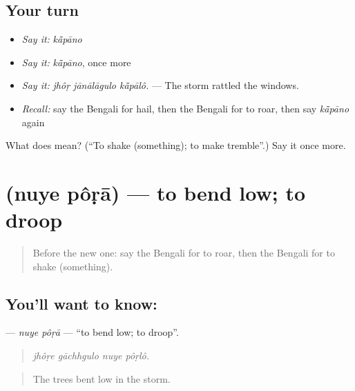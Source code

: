 \subsection*{Your turn}
\begin{itemize}
\raggedright
  \item \emph{Say it:} \emph{kā̃pāno}
  \item \emph{Say it:} \emph{kā̃pāno}, once more
  \item \emph{Say it:} \emph{jhôṛ jānālāgulo kā̃pālô.} — The storm rattled the windows.
  \item \emph{Recall:} say the Bengali for hail, then the Bengali for to roar, then say \emph{kā̃pāno} again
\end{itemize}

\begin{tcolorbox}[breakable,colback=teal!4,colframe=teal!35!black,title={Before you move on}]
What does  mean? (\textquotedblleft{}To shake (something); to make tremble\textquotedblright{}.) Say it once more.
\end{tcolorbox}
\section[\texorpdfstring{\bn{নুয়ে} \bn{পড়া} (nuye pôṛā)}{নুয়ে পড়া (nuye pôṛā)}]{  (nuye pôṛā) — to bend low; to droop}

\label{lesson:BN-C429-nuye-pora}



\begin{quote}
Before the new one: say the Bengali for to roar, then the Bengali for to shake (something).
\end{quote}

\subsection*{You'll want to know:  }
\textbf{ } — \emph{nuye pôṛā} — \textquotedblleft{}to bend low; to droop\textquotedblright{}.

\begin{quote}
   
\end{quote}

\begin{quote}
\emph{jhôṛe gāchhgulo nuye pôṛlô.}
\end{quote}

\begin{quote}
The trees bent low in the storm.
\end{quote}

